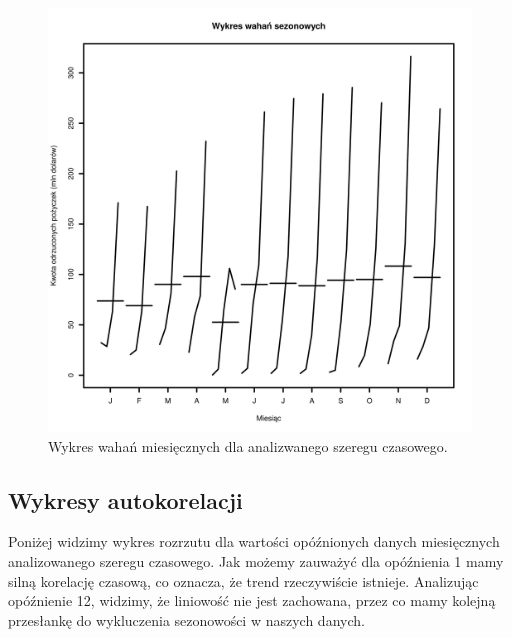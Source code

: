 \documentclass[11pt]{article}
\begin{document}
\begin{figure}[h]

    \centering
	\includegraphics[width=\textwidth]{images/data_monthly_train_miesieczny_ogolny.png}
    \caption{Wykres wahań miesięcznych dla analizwanego szeregu czasowego.}
    \label{fig:data_monthly_train_miesieczny_ogolny}

\end{figure}

\newpage

\subsection{Wykresy autokorelacji}

Poniżej widzimy wykres rozrzutu dla wartości opóźnionych danych miesięcznych analizowanego szeregu czasowego. Jak możemy zauważyć dla opóźnienia 1 mamy silną korelację czasową, co oznacza, że trend rzeczywiście istnieje. Analizując opóźnienie 12, widzimy, że liniowość nie jest zachowana, przez co mamy kolejną przesłankę do wykluczenia sezonowości w naszych danych.
\end{document}
